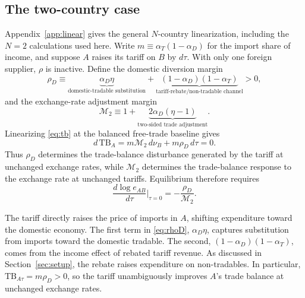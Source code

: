 \documentclass[11pt]{article}
\begin{document}
\subsection{The two-country case}
\label{sec:twocountry}

Appendix~\ref{app:linear} gives the general $N$-country linearization, including the $N=2$ calculations used here. Write $m \equiv \alpha_T(1-\alpha_D)$ for the import share of income, and suppose $A$ raises its tariff on $B$ by $d\tau$. With only one foreign supplier, $\rho$ is inactive. Define the domestic diversion margin
\begin{equation}
\rho_D \equiv
\underbrace{\alpha_D\eta}_{\text{domestic-tradable substitution}}
+
\underbrace{(1-\alpha_D)(1-\alpha_T)}_{\text{tariff-rebate/non-tradable channel}} > 0,
\label{eq:rhoD}
\end{equation}
and the exchange-rate adjustment margin
\begin{equation}
\mathcal M_2 \equiv
1
+
\underbrace{2\alpha_D(\eta-1)}_{\text{two-sided trade adjustment}}.
\label{eq:M2}
\end{equation}
Linearizing \eqref{eq:tb} at the balanced free-trade baseline gives
\begin{equation}
d\,\mathrm{TB}_A = m\mathcal M_2\,d\nu_B + m\rho_D\,d\tau = 0.
\label{eq:2c-collected}
\end{equation}
Thus $\rho_D$ determines the trade-balance disturbance generated by the tariff at unchanged exchange rates, while $\mathcal M_2$ determines the trade-balance response to the exchange rate at unchanged tariffs. Equilibrium therefore requires
\begin{equation}
\frac{d\log e_{AB}}{d\tau}\bigg|_{\tau=0} = -\frac{\rho_D}{\mathcal M_2}.
\label{eq:2c-slope}
\end{equation}

The tariff directly raises the price of imports in $A$, shifting expenditure toward the domestic economy. The first term in \eqref{eq:rhoD}, $\alpha_D\eta$, captures substitution from imports toward the domestic tradable. The second, $(1-\alpha_D)(1-\alpha_T)$, comes from the income effect of rebated tariff revenue. As discussed in Section~\ref{sec:setup}, the rebate raises expenditure on non-tradables. In particular, $\mathrm{TB}_{A\tau}=m\rho_D>0$, so the tariff unambiguously improves $A$'s trade balance at unchanged exchange rates.
\end{document}
